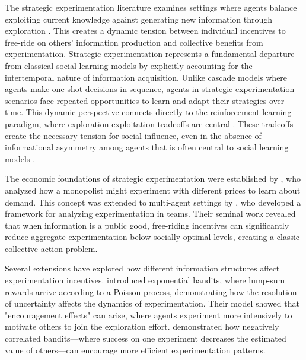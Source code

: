 The strategic experimentation literature examines settings where agents balance exploiting current knowledge against generating new information through exploration \citep{bolton1999strategic, keller2005strategic}. This creates a dynamic tension between individual incentives to free-ride on others' information production and collective benefits from experimentation. Strategic experimentation represents a fundamental departure from classical social learning models by explicitly accounting for the intertemporal nature of information acquisition. Unlike cascade models where agents make one-shot decisions in sequence, agents in strategic experimentation scenarios face repeated opportunities to learn and adapt their strategies over time. This dynamic perspective connects directly to the reinforcement learning paradigm, where exploration-exploitation tradeoffs are central \citep{sutton2018reinforcement}. These tradeoffs create the necessary tension for social influence, even in the absence of informational asymmetry among agents that is often central to social learning models \citep{gale2003bayesian}.

The economic foundations of strategic experimentation were established by \citet{rothschild1974two}, who analyzed how a monopolist might experiment with different prices to learn about demand. This concept was extended to multi-agent settings by \citet{bolton1999strategic}, who developed a framework for analyzing experimentation in teams. Their seminal work revealed that when information is a public good, free-riding incentives can significantly reduce aggregate experimentation below socially optimal levels, creating a classic collective action problem.

Several extensions have explored how different information structures affect experimentation incentives. \citet{keller2005strategic} introduced exponential bandits, where lump-sum rewards arrive according to a Poisson process, demonstrating how the resolution of uncertainty affects the dynamics of experimentation. Their model showed that "encouragement effects" can arise, where agents experiment more intensively to motivate others to join the exploration effort. \citet{klein2011negatively} demonstrated how negatively correlated bandits—where success on one experiment decreases the estimated value of others—can encourage more efficient experimentation patterns. 
\iffalse
\citet{bonatti2017dynamic} further showed how competition in experimentation can sometimes overcome free-riding tendencies and increase information production through strategic preemption.\fi

